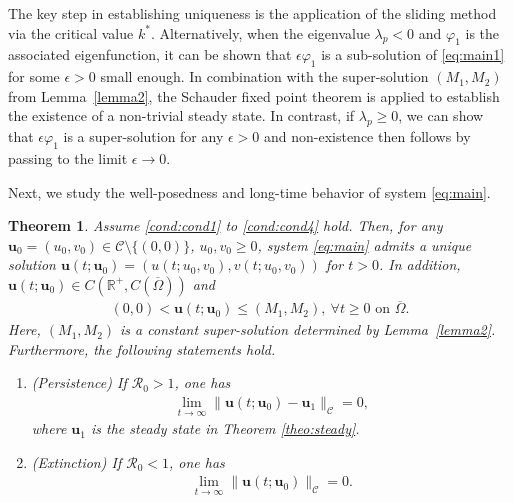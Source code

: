 \documentclass[a4paper,11pt]{amsart}
\newtheorem{theorem}{Theorem}
\theoremstyle{definition}
\def\R{\mathbb{R}}
\def\O{\Omega}
\numberwithin{equation}{section}
\theoremstyle{definition}
\def\O{\Omega}
\begin{document}
The key step in establishing uniqueness is the application of the sliding method via the critical value $k^*$. Alternatively, when the eigenvalue $\lambda_p < 0$ and $\varphi_1$ is the associated eigenfunction, it can be shown that $\epsilon \varphi_1$ is a sub-solution of \eqref{eq:main1} for some $\epsilon>0$ small enough. In combination with the super-solution $(M_1, M_2)$ from Lemma~\ref{lemma2}, the Schauder fixed point theorem is applied to establish the existence of a non-trivial steady state. In contrast, if $\lambda_p \geq 0$, we can show that $\epsilon \varphi_1$ is a super-solution for any $\epsilon > 0$ and non-existence then follows by passing to the limit $\epsilon \to 0$.


Next, we study the well-posedness and long-time behavior of system \eqref{eq:main}.

\begin{theorem}\label{theo:existence}
Assume \ref{cond:cond1} to \ref{cond:cond4} hold. Then, for any $\textbf{u}_0=(u_0,v_0)\in \mathcal{C}\setminus \{(0,0)\}$, $u_0,v_0\geq 0$, system \eqref{eq:main} admits a unique solution $\textbf{u}(t;\textbf{u}_0)=(u(t;u_0,v_0),v(t;u_0,v_0))$ for $t>0$. In addition, $\textbf{u}(t;\textbf{u}_0)\in C(\R^+,C(\overline{\O}))$ and
\begin{align*}
(0,0)<\textbf{u}(t;\textbf{u}_0)\leq (M_1,M_2),~\forall t\geq 0\text{ on }\overline{\O}.
\end{align*}
Here, $(M_1,M_2)$ is a constant super-solution determined by Lemma~\ref{lemma2}. 
Furthermore, the following statements hold.


\begin{enumerate}[label=(\roman*)]
\item(Persistence) \label{casei} If $\mathcal{R}_0>1$, one has 
\begin{align*}
\lim_{t\rightarrow \infty}\|\textbf{u}(t;\textbf{u}_0)-\textbf{u}_1\|_{\mathcal{C}}=0,
\end{align*}
where  $\textbf{u}_1$ is the steady state in Theorem \ref{theo:steady}.

\item(Extinction) \label{caseii} If $\mathcal{R}_0<1$, one has 
\begin{align*}
\lim_{t\rightarrow \infty}\|\textbf{u}(t;\textbf{u}_0)\|_{\mathcal{C}}=0.
\end{align*}

\end{enumerate}

\end{theorem}
\end{document}
